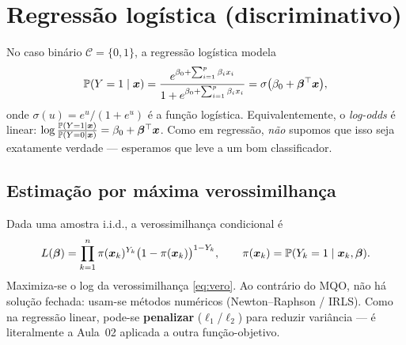 \documentclass[11pt,a4paper]{article}
\begin{document}
\section{Regressão logística (discriminativo)}
No caso binário $\mathcal{C}=\{0,1\}$, a regressão logística modela
\begin{equation}\label{eq:logit}
  \mathbb{P}(Y=1\mid\bm{x}) = \frac{e^{\beta_0+\sum_{i=1}^p\beta_i x_i}}
                          {1+e^{\beta_0+\sum_{i=1}^p\beta_i x_i}}
  = \sigma\big(\beta_0+\bm{\beta}^\top\bm{x}\big),
\end{equation}
onde $\sigma(u)=e^u/(1+e^u)$ é a função logística. Equivalentemente, o
\emph{log-odds} é linear: $\log\frac{\mathbb{P}(Y=1\mid\bm{x})}{\mathbb{P}(Y=0\mid\bm{x})}
=\beta_0+\bm{\beta}^\top\bm{x}$. Como em regressão, \emph{não} supomos que isso seja
exatamente verdade --- esperamos que leve a um bom classificador.


\subsection{Estimação por máxima verossimilhança}
Dada uma amostra i.i.d., a verossimilhança condicional é
\begin{equation}\label{eq:vero}
  L(\bm{\beta}) = \prod_{k=1}^n \pi(\bm{x}_k)^{Y_k}\big(1-\pi(\bm{x}_k)\big)^{1-Y_k},
  \qquad \pi(\bm{x}_k)=\mathbb{P}(Y_k=1\mid\bm{x}_k,\bm{\beta}).
\end{equation}
Maximiza-se o log da verossimilhança \eqref{eq:vero}. Ao contrário do MQO, não há
solução fechada: usam-se métodos numéricos (Newton--Raphson / IRLS). Como na
regressão linear, pode-se \textbf{penalizar} ($\ell_1$/$\ell_2$) para reduzir
variância --- é literalmente a Aula~02 aplicada a outra função-objetivo.
\end{document}
